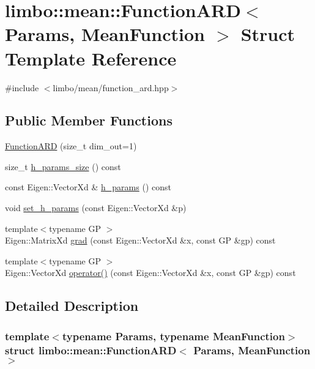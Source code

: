 \hypertarget{structlimbo_1_1mean_1_1_function_a_r_d}{}\section{limbo\+:\+:mean\+:\+:Function\+A\+R\+D$<$ Params, Mean\+Function $>$ Struct Template Reference}
\label{structlimbo_1_1mean_1_1_function_a_r_d}


{\ttfamily \#include $<$limbo/mean/function\+\_\+ard.\+hpp$>$}

\subsection*{Public Member Functions}
\begin{DoxyCompactItemize}
\item 
\hyperlink{structlimbo_1_1mean_1_1_function_a_r_d_ae43aef0e74455e5c97dd2d8cda17a0a1}{Function\+A\+R\+D} (size\+\_\+t dim\+\_\+out=1)
\item 
size\+\_\+t \hyperlink{structlimbo_1_1mean_1_1_function_a_r_d_aaf1b474fc0a0c7b9738da60bca99b45b}{h\+\_\+params\+\_\+size} () const 
\item 
const Eigen\+::\+Vector\+Xd \& \hyperlink{structlimbo_1_1mean_1_1_function_a_r_d_a4b8676c860264932e5ebd302e46e1a42}{h\+\_\+params} () const 
\item 
void \hyperlink{structlimbo_1_1mean_1_1_function_a_r_d_a02dabc2cbdf001450cdd893f578c042d}{set\+\_\+h\+\_\+params} (const Eigen\+::\+Vector\+Xd \&p)
\item 
{\footnotesize template$<$typename G\+P $>$ }\\Eigen\+::\+Matrix\+Xd \hyperlink{structlimbo_1_1mean_1_1_function_a_r_d_a5bd1343c7f3616c066296813361d9a96}{grad} (const Eigen\+::\+Vector\+Xd \&x, const G\+P \&gp) const 
\item 
{\footnotesize template$<$typename G\+P $>$ }\\Eigen\+::\+Vector\+Xd \hyperlink{structlimbo_1_1mean_1_1_function_a_r_d_acfc9ce5670a247a35a1f09e5f0a09adb}{operator()} (const Eigen\+::\+Vector\+Xd \&x, const G\+P \&gp) const 
\end{DoxyCompactItemize}


\subsection{Detailed Description}
\subsubsection*{template$<$typename Params, typename Mean\+Function$>$struct limbo\+::mean\+::\+Function\+A\+R\+D$<$ Params, Mean\+Function $>$}

